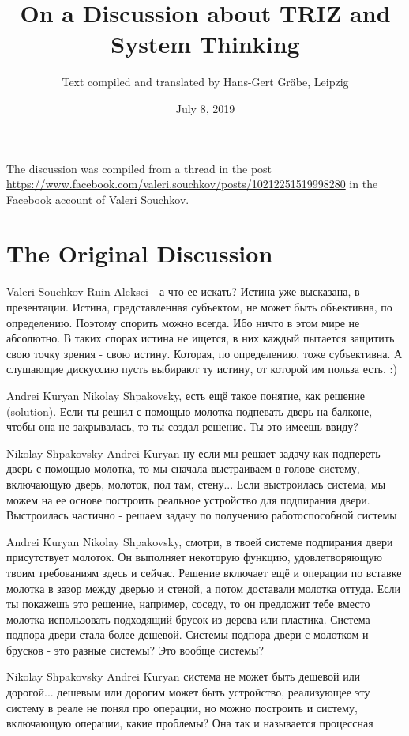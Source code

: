 \documentclass[11pt,a4paper]{article}
\title{On a Discussion about TRIZ and System Thinking}
\author{Text compiled and translated by Hans-Gert Gr\"abe, Leipzig}
\date{July 8, 2019}
\begin{document}
\maketitle

The discussion was compiled from a thread in the post
\url{https://www.facebook.com/valeri.souchkov/posts/10212251519998280} in the
Facebook account of Valeri Souchkov. 

\section*{The Original Discussion}

Valeri Souchkov Ruin Aleksei - а что ее искать? Истина уже высказана, в
презентации. Истина, представленная субъектом, не может быть объективна, по
определению. Поэтому спорить можно всегда. Ибо ничто в этом мире не
абсолютно. В таких спорах истина не ищется, в них каждый пытается защитить
свою точку зрения - свою истину. Которая, по определению, тоже субъективна. А
слушающие дискуссию пусть выбирают ту истину, от которой им польза есть. :)

Andrei Kuryan Nikolay Shpakovsky, есть ещё такое понятие, как решение
(solution).  Если ты решил с помощью молотка подпевать дверь на балконе, чтобы
она не закрывалась, то ты создал решение. Ты это имеешь ввиду?

Nikolay Shpakovsky Andrei Kuryan ну если мы решает задачу как подпереть дверь
с помощью молотка, то мы сначала выстраиваем в голове систему, включающую
дверь, молоток, пол там, стену...  Если выстроилась система, мы можем на ее
основе построить реальное устройство для подпирания двери.  Выстроилась
частично - решаем задачу по получению работоспособной системы

Andrei Kuryan Nikolay Shpakovsky, смотри, в твоей системе подпирания двери
присутствует молоток. Он выполняет некоторую функцию, удовлетворяющую твоим
требованиям здесь и сейчас. Решение включает ещё и операции по вставке молотка
в зазор между дверью и стеной, а потом доставали молотка оттуда.  Если ты
покажешь это решение, например, соседу, то он предложит тебе вместо молотка
использовать подходящий брусок из дерева или пластика.  Система подпора двери
стала более дешевой.  Системы подпора двери с молотком и брусков - это разные
системы? Это вообще системы?

Nikolay Shpakovsky Andrei Kuryan система не может быть дешевой или дорогой...
дешевым или дорогим может быть устройство, реализующее эту систему в реале не
понял про операции, но можно построить и систему, включающую операции, какие
проблемы? Она так и называется процессная
\end{document}

